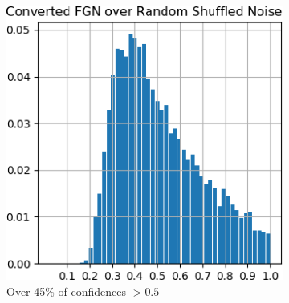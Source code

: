 \documentclass[12pt,oneside]{CUNY_PhD}
\begin{document}
\begin{figure}[!h]
\begin{subfigure}[t]{0.49\textwidth}
        \includegraphics[width=\textwidth]{images/mnist-behavior/converted-hist-shuffled.png}
        \caption*{Over 45\% of confidences $>0.5$}
    \end{subfigure}
    \caption{}
    \label{fig:converted-hist}
\end{figure}
\end{document}
